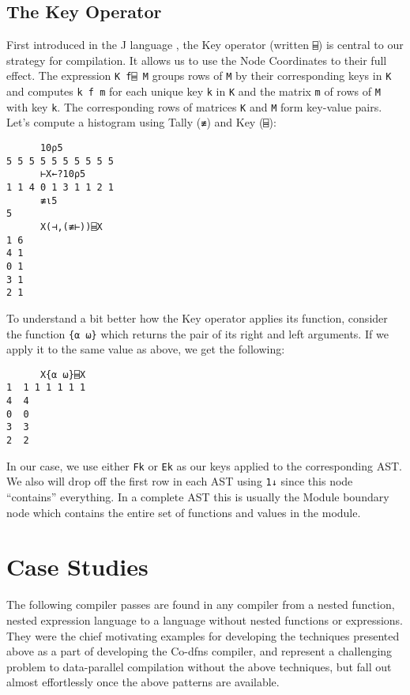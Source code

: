 \documentclass[numbers,9pt]{sigplanconf}
\begin{document}
\subsection{The Key Operator}

First introduced in the J language \cite{hui2014key},
the Key operator (written \verb;⌸;) is central to our strategy for compilation.
It allows us to use the Node Coordinates to their full effect. 
The expression \verb;K f⌸ M; groups rows of \verb;M; by their corresponding 
keys in \verb;K; and computes \verb;k f m; for each unique key \verb;k; in 
\verb;K; and the matrix \verb;m; of rows of \verb;M; with key \verb;k;. 
The corresponding rows of matrices \verb;K; and \verb;M; form key-value pairs.
Let's compute a histogram using Tally (\verb;≢;) and Key (\verb;⌸;):

\begin{verbatim}
      10⍴5
5 5 5 5 5 5 5 5 5 5
      ⊢X←?10⍴5
1 1 4 0 1 3 1 1 2 1
      ≢⍳5
5
      X(⊣,(≢⊢))⌸X
1 6
4 1
0 1
3 1
2 1
\end{verbatim}

\noindent
To understand a bit better how the Key operator applies its function,
consider the function \verb;{⍺ ⍵}; which returns the pair of its right
and left arguments. If we apply it to the same value as above, we
get the following:

\begin{verbatim}
      X{⍺ ⍵}⌸X
1  1 1 1 1 1 1 
4  4           
0  0           
3  3           
2  2
\end{verbatim}

\noindent
In our case, we use either \verb;Fk; or \verb;Ek; as our keys applied to the
corresponding AST. We also will drop off the first row in each AST
using \verb;1↓; since this node ``contains'' everything. In a complete
AST this is usually the Module boundary node which contains the entire
set of functions and values in the module.

\section{Case Studies}

The following compiler passes are found in any compiler from a nested function, 
nested expression language to a language without nested functions 
or expressions. They were the chief motivating examples for developing the 
techniques presented above as a part of developing the Co-dfns compiler, 
and represent a challenging problem to data-parallel compilation without 
the above techniques, but fall out almost effortlessly once the above patterns 
are available. 
\end{document}
